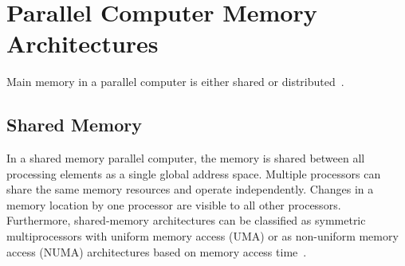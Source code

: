 \section{Parallel Computer Memory Architectures}
Main memory in a parallel computer is either shared or distributed~\cite{patterson2013computer}.

\subsection{Shared Memory}
In a shared memory parallel computer, the memory is shared between all processing elements as a single global address space. Multiple processors can share the same memory resources and operate independently. Changes in a memory location by one processor are visible to all other processors.\\ 
Furthermore, shared-memory architectures can be classified as symmetric multiprocessors with uniform memory access (UMA) or as non-uniform memory access (NUMA) architectures based on memory access time~\cite{kshemkalyani2008distributed,sutter2005free}.


